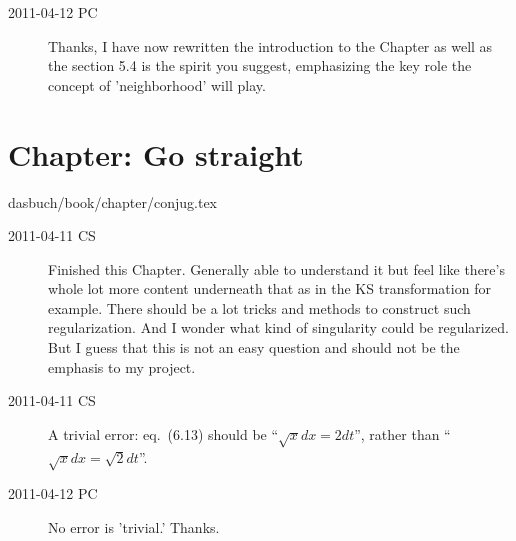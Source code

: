 \begin{description}

\item[2011-04-12 PC] Thanks, I have now rewritten the introduction to the
Chapter as well as the section 5.4 is the spirit you suggest, emphasizing
the key role the concept of 'neighborhood' will play.

\end{description}


\section{Chapter: Go straight}
\label{c-conjug}\noindent dasbuch/book/chapter/conjug.tex
\begin{description}

\item[2011-04-11 CS]
Finished this Chapter. Generally able to understand it but feel like
there's whole lot more content underneath that as in the KS
transformation for example. There should be a lot tricks and methods to
construct such regularization. And I wonder what kind of singularity
could be regularized. But I guess that this is not an easy question and
should not be the emphasis to my project.


\item[2011-04-11 CS]
A trivial error: eq.~(6.13) should be ``$\sqrt{x}dx = 2dt$'',
rather than ``$\sqrt{x}dx = \sqrt{2}dt$''.

\item[2011-04-12 PC]
No error is 'trivial.' Thanks.

\end{description}


